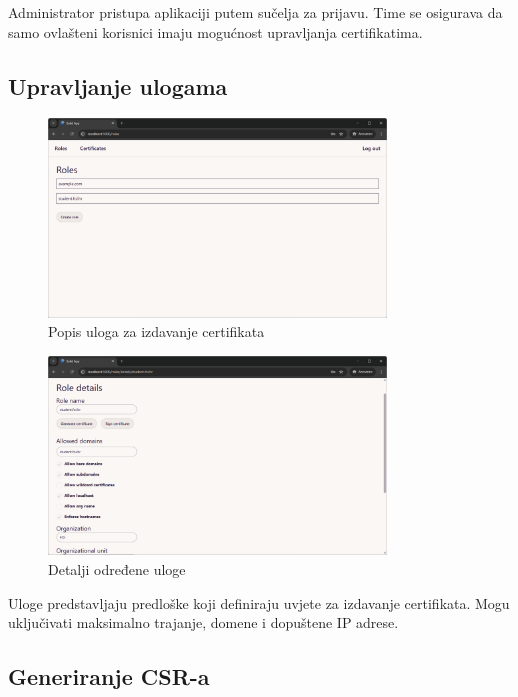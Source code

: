 \documentclass[]{foi}
\begin{document}
Administrator pristupa aplikaciji putem sučelja za prijavu. Time se osigurava da samo ovlašteni korisnici imaju mogućnost upravljanja certifikatima.

\subsection{Upravljanje ulogama}

\begin{figure}[H]
    \centering
    \includegraphics[width=0.8\textwidth]{assets/roles.png}
    \caption{Popis uloga za izdavanje certifikata}
\end{figure}

\begin{figure}[H]
    \centering
    \includegraphics[width=0.8\textwidth]{assets/role-details.png}
    \caption{Detalji određene uloge}
\end{figure}

Uloge predstavljaju predloške koji definiraju uvjete za izdavanje certifikata. Mogu uključivati maksimalno trajanje, domene i dopuštene IP adrese.

\subsection{Generiranje CSR-a}
\end{document}
